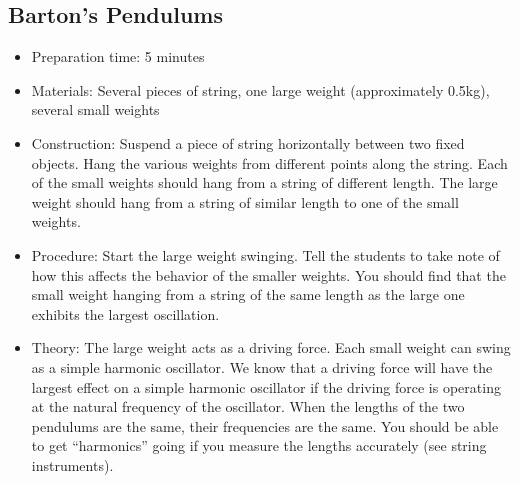 \subsection{Barton’s Pendulums}
\begin{itemize}
\item{Preparation time: 5 minutes}
\item{Materials: Several pieces of string, one large weight (approximately 0.5kg), several small weights}
\item{Construction: Suspend a piece of string horizontally between two fixed objects. Hang the various weights from different points along the string. Each of the small weights should hang from a string of different length. The large weight should hang from a string of similar length to one of the small weights.}
\item{Procedure: Start the large weight swinging. Tell the students to take note of how this affects the behavior of the smaller weights. You should find that the small weight hanging from a string of the same length as the large one exhibits the largest oscillation.}
\item{Theory: The large weight acts as a driving force. Each small weight can swing as a simple harmonic oscillator. We know that a driving force will have the largest effect on a simple harmonic oscillator if the driving force is operating at the natural frequency of the oscillator. When the lengths of the two pendulums are the same, their frequencies are the same. You should be able to get “harmonics” going if you measure the lengths accurately (see string instruments).}
\end{itemize}


